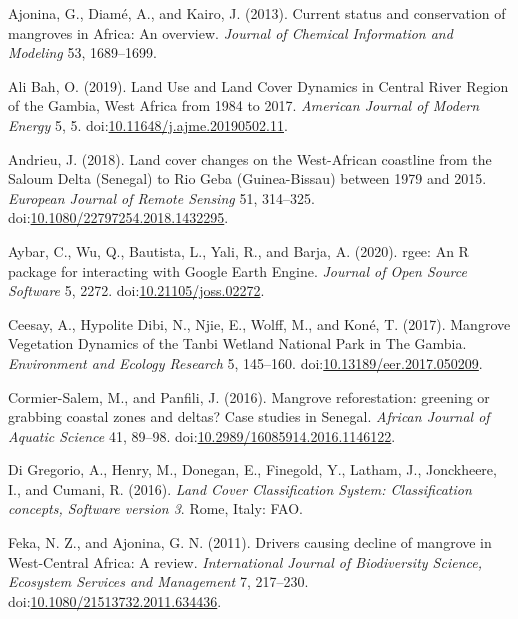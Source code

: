 \documentclass[utf8]{frontiersSCNS}
\newlength{\cslhangindent}
\newlength{\cslentryspacingunit} %
\newenvironment{CSLReferences}[2] %
 {%
  \setlength{\parindent}{0pt}
  \ifodd #1
  \let\oldpar\par
  \def\par{\hangindent=\cslhangindent\oldpar}
  \fi
  \setlength{\parskip}{#2\cslentryspacingunit}
 }%
 {}
\begin{document}
\hypertarget{refs}{}
\begin{CSLReferences}{1}{0}
\leavevmode\hypertarget{ref-Ajonina-et-al-2013}{}%
Ajonina, G., Diamé, A., and Kairo, J. (2013). {Current status and
conservation of mangroves in Africa: An overview.} \emph{Journal of
Chemical Information and Modeling} 53, 1689--1699.

\leavevmode\hypertarget{ref-AliBah-2019}{}%
Ali Bah, O. (2019). {Land Use and Land Cover Dynamics in Central River
Region of the Gambia, West Africa from 1984 to 2017}. \emph{American
Journal of Modern Energy} 5, 5.
doi:\href{https://doi.org/10.11648/j.ajme.20190502.11}{10.11648/j.ajme.20190502.11}.

\leavevmode\hypertarget{ref-Andrieu-2018}{}%
Andrieu, J. (2018). {Land cover changes on the West-African coastline
from the Saloum Delta (Senegal) to Rio Geba (Guinea-Bissau) between 1979
and 2015}. \emph{European Journal of Remote Sensing} 51, 314--325.
doi:\href{https://doi.org/10.1080/22797254.2018.1432295}{10.1080/22797254.2018.1432295}.

\leavevmode\hypertarget{ref-Aybar-et-al-2020}{}%
Aybar, C., Wu, Q., Bautista, L., Yali, R., and Barja, A. (2020). {rgee:
An R package for interacting with Google Earth Engine}. \emph{Journal of
Open Source Software} 5, 2272.
doi:\href{https://doi.org/10.21105/joss.02272}{10.21105/joss.02272}.

\leavevmode\hypertarget{ref-Ceesay-et-al-2017}{}%
Ceesay, A., Hypolite Dibi, N., Njie, E., Wolff, M., and Koné, T. (2017).
{Mangrove Vegetation Dynamics of the Tanbi Wetland National Park in The
Gambia}. \emph{Environment and Ecology Research} 5, 145--160.
doi:\href{https://doi.org/10.13189/eer.2017.050209}{10.13189/eer.2017.050209}.

\leavevmode\hypertarget{ref-Cormier-Salem-and-Panfili-2016}{}%
Cormier-Salem, M., and Panfili, J. (2016). {Mangrove reforestation:
greening or grabbing coastal zones and deltas? Case studies in Senegal}.
\emph{African Journal of Aquatic Science} 41, 89--98.
doi:\href{https://doi.org/10.2989/16085914.2016.1146122}{10.2989/16085914.2016.1146122}.

\leavevmode\hypertarget{ref-Di-Gregorio-et-al-2016}{}%
Di Gregorio, A., Henry, M., Donegan, E., Finegold, Y., Latham, J.,
Jonckheere, I., and Cumani, R. (2016). \emph{{Land Cover Classification
System: Classification concepts, Software version 3}}. Rome, Italy: FAO.

\leavevmode\hypertarget{ref-Feka-and-Ajonina-2011}{}%
Feka, N. Z., and Ajonina, G. N. (2011). {Drivers causing decline of
mangrove in West-Central Africa: A review}. \emph{International Journal
of Biodiversity Science, Ecosystem Services and Management} 7, 217--230.
doi:\href{https://doi.org/10.1080/21513732.2011.634436}{10.1080/21513732.2011.634436}.


\end{CSLReferences}
\end{document}

